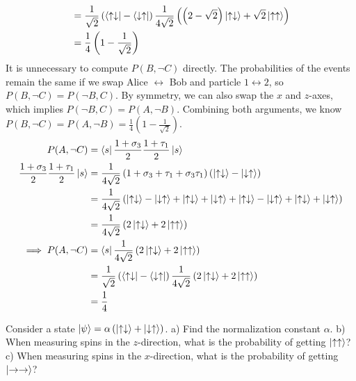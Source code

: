 \documentclass[12pt]{book} %
\numberwithin{equation}{chapter}
\def\a{\alpha}
\def\s{\sigma}
\def\t{\tau}
\begin{document}
\begin{solbox}
\begin{align*}
&=\frac{1}{\sqrt{2}}\left(\bra{\uparrow\downarrow}-\bra{\downarrow\uparrow}\right)\frac{1}{4\sqrt{2}}\left(\left(2-\sqrt{2}\right)\ket{\uparrow\downarrow}+\sqrt{2}\ket{\uparrow\uparrow}\right)\\
&=\frac{1}{4}\left(1-\frac{1}{\sqrt{2}}\right)
\end{align*}
It is unnecessary to compute $P(B, \neg C)$ directly. The probabilities of the events remain the same if we swap Alice $\leftrightarrow$ Bob and particle $1\leftrightarrow2$, so $P(B, \neg C)=P(\neg B, C)$. By symmetry, we can also swap the $x$ and $z$-axes, which implies $P(\neg B, C)=P(A, \neg B)$. Combining both arguments, we know $P(B, \neg C)=P(A, \neg B)=\frac{1}{4}\left(1-\frac{1}{\sqrt{2}}\right)$.
\begin{align*}
P(A, \neg C)&=\bra{s}\frac{1+\s_{3}}{2}\frac{1+\t_{1}}{2}\ket{s}\\
\frac{1+\s_{3}}{2}\frac{1+\t_{1}}{2}\ket{s}&=\frac{1}{4\sqrt{2}}\left(1+\s_{3}+\t_{1}+\s_{3}\t_{1}\right)\left(\ket{\uparrow\downarrow}-\ket{\downarrow\uparrow}\right)\\
&=\frac{1}{4\sqrt{2}}\left(\ket{\uparrow\downarrow}-\ket{\downarrow\uparrow}+\ket{\uparrow\downarrow}+\ket{\downarrow\uparrow}+\ket{\uparrow\downarrow}-\ket{\downarrow\uparrow}+\ket{\uparrow\downarrow}+\ket{\downarrow\uparrow}\right)\\
&=\frac{1}{4\sqrt{2}}\left(2\ket{\uparrow\downarrow}+2\ket{\uparrow\uparrow}\right)\\
\implies P(A, \neg C)&=\bra{s}\frac{1}{4\sqrt{2}}\left(2\ket{\uparrow\downarrow}+2\ket{\uparrow\uparrow}\right)\\
&=\frac{1}{\sqrt{2}}\left(\bra{\uparrow\downarrow}-\bra{\downarrow\uparrow}\right)\frac{1}{4\sqrt{2}}\left(2\ket{\uparrow\downarrow}+2\ket{\uparrow\uparrow}\right)\\
&=\frac{1}{4}
\end{align*}
\end{solbox}

\begin{problem}
Consider a state $\ket{\psi}=\a\left(\ket{\uparrow\downarrow}+\ket{\downarrow\uparrow}\right)$.\bigskip\newline
a) Find the normalization constant $\a$.\bigskip\newline
b) When measuring spins in the $z$-direction, what is the probability of getting $\ket{\uparrow\uparrow}$?\bigskip\newline
c) When measuring spins in the $x$-direction, what is the probability of getting $\ket{\rightarrow\rightarrow}$?
\end{problem}
\end{document}
